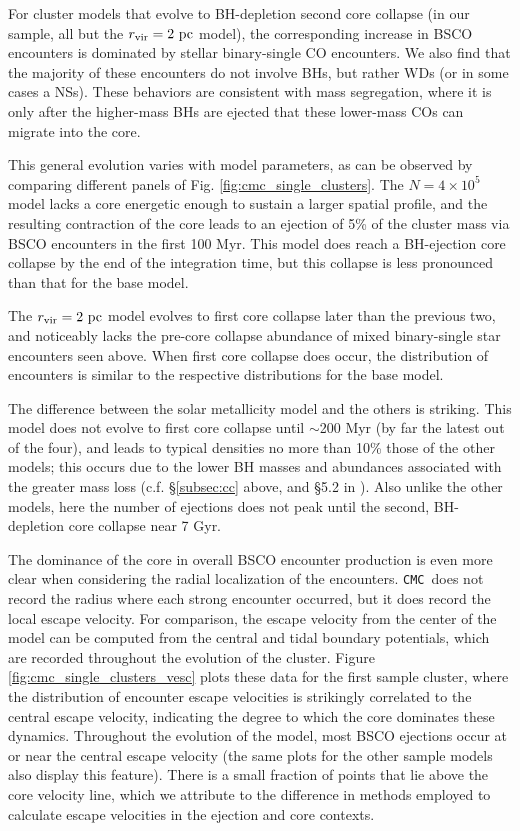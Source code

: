 \documentclass[twocolumn]{aastex631}
\newcommand{\CMC}{\texttt{CMC}}
\begin{document}
For cluster models that evolve to BH-depletion second core collapse (in our sample, all but the $r_{\rm vir} = 2~{\rm pc}$ model), the corresponding increase in BSCO encounters is dominated by stellar binary-single CO encounters.
We also find that the majority of these encounters do not involve BHs, but rather WDs (or in some cases a NSs).
These behaviors are consistent with mass segregation, where it is only after the higher-mass BHs are ejected that these lower-mass COs can migrate into the core.

This general evolution varies with model parameters, as can be observed by comparing different panels of Fig. \ref{fig:cmc_single_clusters}.
The $N = 4 \times 10^5$ model lacks a core energetic enough to sustain a larger spatial profile, and the resulting contraction of the core leads to an ejection of 5\% of the cluster mass via BSCO encounters in the first 100 Myr.
This model does reach a BH-ejection core collapse by the end of the integration time, but this collapse is less pronounced than that for the base model.

The $r_{\rm vir} = 2~{\rm pc}$ model evolves to first core collapse later than the previous two, and noticeably lacks the pre-core collapse abundance of mixed binary-single star encounters seen above.
When first core collapse does occur, the distribution of encounters is similar to the respective distributions for the base model.

The difference between the solar metallicity model and the others is striking.
This model does not evolve to first core collapse until $\sim$200 Myr (by far the latest out of the four), and leads to typical densities no more than 10\% those of the other models; this occurs due to the lower BH masses and abundances associated with the greater mass loss (c.f. \S\ref{subsec:cc} above, and \S5.2 in \citet{2022arXiv220316547R}).
Also unlike the other models, here the number of ejections does not peak until the second, BH-depletion core collapse near 7 Gyr.

The dominance of the core in overall BSCO encounter production is even more clear when considering the radial localization of the encounters.
\CMC\ does not record the radius where each strong encounter occurred, but it does record the local escape velocity.
For comparison, the escape velocity from the center of the model can be computed from the central and tidal boundary potentials, which are recorded throughout the evolution of the cluster.
Figure \ref{fig:cmc_single_clusters_vesc} plots these data for the first sample cluster, where the distribution of encounter escape velocities is strikingly correlated to the central escape velocity, indicating the degree to which the core dominates these dynamics.
Throughout the evolution of the model, most BSCO ejections occur at or near the central escape velocity (the same plots for the other sample models also display this feature).
There is a small fraction of points that lie above the core velocity line, which we attribute to the difference in methods employed to calculate escape velocities in the ejection and core contexts.
\end{document}

